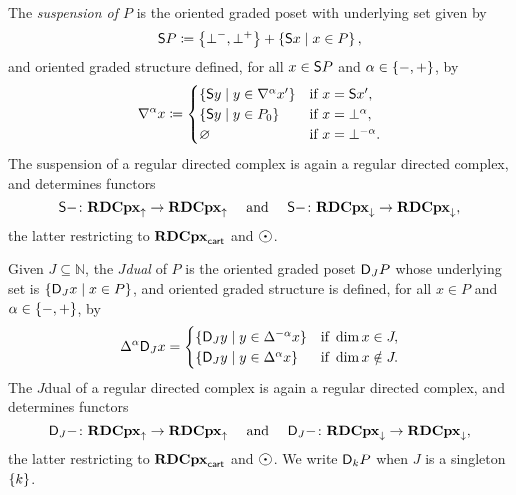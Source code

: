 The \emph{suspension of \( P \)} is the oriented graded poset with underlying set given by
\begin{equation*}
    \sus{P} \eqdef \set{\bot^-, \bot^+} + \set{\sus{x} \mid x \in P},
\end{equation*}
and oriented graded structure defined, for all \( x \in \sus{P} \) and \( \a \in \set{-, +} \), by
\begin{equation*}
    \cofaces{}{\a} x \eqdef 
    \begin{cases}
        \set{\sus{y} \mid y \in \cofaces{}{\a} x'} & \text{if } x = \sus{x'}, \\
        \set{\sus{y} \mid y \in \gr{0}{P}} & \text{if } x = \bot^\a, \\
        \varnothing & \text{if } x = \bot^{- \a}.
    \end{cases}
\end{equation*}
The suspension of a regular directed complex is again a regular directed complex, and determines functors
\begin{equation*}
    \sus{-} \colon \rdcpxcomap \to \rdcpxcomap \quad\text{ and }\quad \sus{-} \colon \rdcpxmap \to \rdcpxmap,
\end{equation*}
the latter restricting to \( \rdcpxcart \) and \( \atom \).

Given \( J \subseteq \mathbb{N} \), the \emph{\( J \)\nbd dual} of \( P \) is the oriented graded poset \( \dual{J}{P} \) whose underlying set is \( \set{\dual{J}{x} \mid x \in P} \), and oriented graded structure is defined, for all \( x \in P \) and \( \a \in \set{-, +} \), by
\begin{equation*}
    \faces{}{\a} \dual{J}{x} = 
    \begin{cases}
        \set{\dual{J}{y} \mid y \in \faces{}{-\a} x} & \text{if } \dim x \in J,\\
        \set{\dual{J}{y} \mid y \in \faces{}{\a} x}  & \text{if } \dim x \notin J.
    \end{cases}
\end{equation*}
The \( J \)\nbd dual of a regular directed complex is again a regular directed complex, and determines functors 
\begin{equation*}
    \dual{J}{-} \colon \rdcpxcomap \to \rdcpxcomap \quad\text{ and }\quad \dual{J}{-} \colon \rdcpxmap \to \rdcpxmap,
\end{equation*}
the latter restricting to \( \rdcpxcart \) and \( \atom \).
We write \( \dual{k}{P} \) when \( J \) is a singleton \( \set{k} \).


